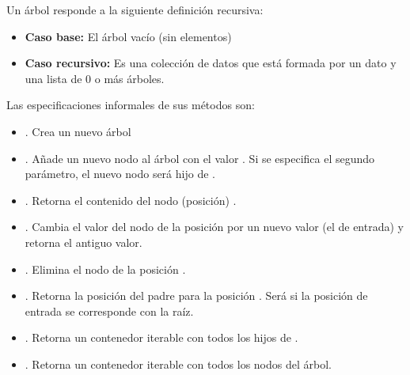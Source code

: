 


\begin{definition}{}  \label{def:arbol}
Un  árbol responde a la siguiente definición recursiva: 
\begin{itemize}
\item \textbf{Caso base:} El árbol vacío (sin elementos)
\item \textbf{Caso recursivo:} Es una colección de datos que está formada por un dato y una lista de 0 o más árboles.
\end{itemize}

\noindent Las especificaciones informales de sus métodos son:

\begin{itemize}
\item {}. Crea un nuevo árbol

\item {}. Añade un nuevo nodo al árbol con el valor  . Si se especifica el segundo parámetro, el nuevo nodo será hijo de  .

\item {}. Retorna el contenido del nodo (posición)  .

\item {}. Cambia el valor del nodo de la posición  por un nuevo valor (el de entrada) y retorna el antiguo valor.

\item {}. Elimina el nodo de la posición .

\item {}. Retorna la posición del padre para la posición  .
Será   si la posición de entrada se corresponde con la raíz.

\item {}. Retorna un contenedor iterable con todos los hijos de  .

\item {}. Retorna un contenedor iterable con todos los nodos del árbol.


\end{itemize}
\end{definition}
